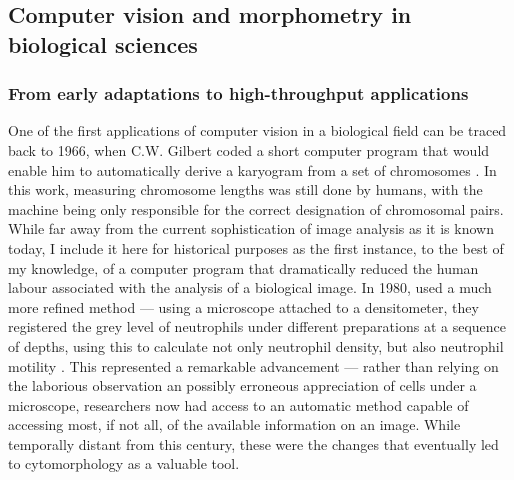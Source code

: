 \subsection{Computer vision and morphometry in biological sciences}

\subsubsection{From early adaptations to high-throughput applications}

One of the first applications of computer vision in a biological field can be traced back to 1966, when C.W. Gilbert coded a short computer program that would enable him to automatically derive a karyogram from a set of chromosomes \cite{Gilbert1966-km}. In this work, measuring chromosome lengths was still done by humans, with the machine being only responsible for the correct designation of chromosomal pairs. While far away from the current sophistication of image analysis as it is known today, I include it here for historical purposes as the first instance, to the best of my knowledge, of a computer program that dramatically reduced the human labour associated with the analysis of a biological image. In 1980,  used a much more refined method --- using a microscope attached to a densitometer, they registered the grey level of neutrophils under different preparations at a sequence of depths, using this to calculate not only neutrophil density, but also neutrophil motility \cite{Howe1980-ua}. This represented a remarkable advancement --- rather than relying on the laborious observation an possibly erroneous appreciation of cells under a microscope, researchers now had access to an automatic method capable of accessing most, if not all, of the available information on an image. While temporally distant from this century, these were the changes that eventually led to cytomorphology as a valuable tool. 

